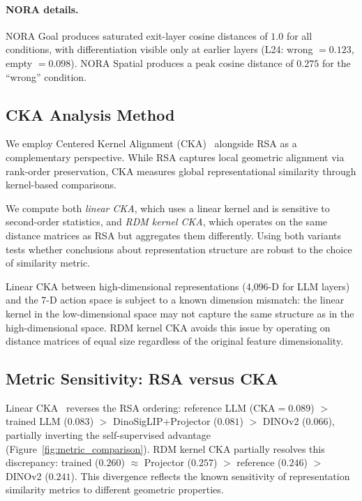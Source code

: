 \paragraph{NORA details.}
NORA Goal produces saturated exit-layer cosine distances of $1.0$ for all conditions, with differentiation visible only at earlier layers (L24: wrong $= 0.123$, empty $= 0.098$).
NORA Spatial produces a peak cosine distance of $0.275$ for the ``wrong'' condition.

\subsection{CKA Analysis Method}
\label{sec:cka_appendix}

We employ Centered Kernel Alignment (CKA)~\cite{kornblith2019} alongside RSA as a complementary perspective.
While RSA captures local geometric alignment via rank-order preservation, CKA measures global representational similarity through kernel-based comparisons.

We compute both \emph{linear CKA}, which uses a linear kernel and is sensitive to second-order statistics, and \emph{RDM kernel CKA}, which operates on the same distance matrices as RSA but aggregates them differently.
Using both variants tests whether conclusions about representation structure are robust to the choice of similarity metric.

Linear CKA between high-dimensional representations (4{,}096-D for LLM layers) and the 7-D action space is subject to a known dimension mismatch: the linear kernel in the low-dimensional space may not capture the same structure as in the high-dimensional space.
RDM kernel CKA avoids this issue by operating on distance matrices of equal size regardless of the original feature dimensionality.

\subsection{Metric Sensitivity: RSA versus CKA}
Linear CKA~\cite{kornblith2019} reverses the RSA ordering: reference LLM ($\text{CKA} = 0.089$) $>$ trained LLM ($0.083$) $>$ DinoSigLIP+Projector ($0.081$) $>$ DINOv2 ($0.066$), partially inverting the self-supervised advantage (Figure~\ref{fig:metric_comparison}).
RDM kernel CKA partially resolves this discrepancy: trained ($0.260$) $\approx$ Projector ($0.257$) $>$ reference ($0.246$) $>$ DINOv2 ($0.241$).
This divergence reflects the known sensitivity of representation similarity metrics to different geometric properties.


